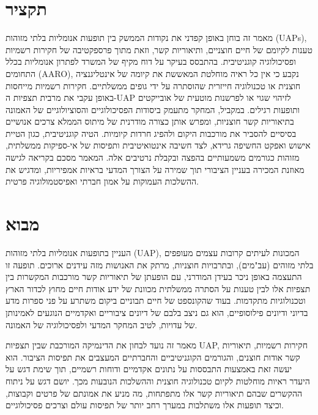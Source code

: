 \documentclass[12pt,a4paper]{article}
\begin{document}
\section*{תקציר}
מאמר זה בוחן באופן קפדני את נקודות הממשק בין תופעות אנומליות בלתי מזוהות (UAPs), טענות לקיומם של חיים חוצניים, ותיאוריות קשר, וזאת מתוך פרספקטיבה של חקירות רשמיות ופסיכולוגיה קוגניטיבית. בהתבסס בעיקר על דוח מקיף של המשרד לפתרון אנומליות בכלל התחומים (AARO), נקבע כי אין כל ראיה מוחלטת המאששת את קיומה של אינטליגנציה חוצנית או טכנולוגיה חייזרית שהוסתרה על ידי גופים ממשלתיים. חקירות רשמיות מייחסות באופן עקבי את מרבית תצפיות ה-UAP לזיהוי שגוי או לפרשנות מוטעית של אובייקטים ותופעות רגילים. במקביל, המחקר מתעמק ביסודות הפסיכולוגיים והסוציולוגיים של האמונה בתיאוריות קשר חוצניות, ומפרש אותן כצורה מודרנית של מיתוס הממלא צרכים אנושיים בסיסיים להסביר את מורכבות היקום ולהפיג חרדות קיומיות. הטיה קוגניטיבית, כגון הטיית אישוש ואפקט החשיפה גרידא, לצד חשיבה אינטואיטיבית ותפיסות של אי-ספיקות ממשלתית, מזוהות כגורמים משמעותיים בהפצה ובקבלת נרטיבים אלה. המאמר מסכם בקריאה לגישה מאוזנת המכירה בעניין הציבורי תוך שמירה על הצורך המדעי בראיות אמפיריות, ומדגיש את ההשלכות העמוקות על אמון חברתי ואפיסטמולוגיה פרטית.

\tableofcontents

\section{מבוא}
העניין בתופעות אנומליות בלתי מזוהות (UAP), המכונות לעיתים קרובות עצמים מעופפים בלתי מזוהים (עב"מים), ובתרבויות חוצניות, מרתק את האנושות מזה עידנים ארוכים. תופעה זו התעצמה באופן ניכר בעידן המודרני, עם הופעתן של תיאוריות קשר מורכבות המקשרות בין תצפיות אלו לבין טענות על הסתרה ממשלתית מכוונת של ידע אודות חיים מחוץ לכדור הארץ וטכנולוגיות מתקדמות. בעוד שהקונספט של חיים תבוניים ביקום משתרע על פני ספרות מדע בדיוני ודיונים פילוסופיים, הוא גם ניצב בלבם של דיונים ציבוריים ואקדמיים הנוגעים לאמינותן של עדויות, לטיב המחקר המדעי ולפסיכולוגיה של האמונה.

מאמר זה נועד לבחון את הדינמיקה המורכבת שבין תצפיות UAP, חקירות רשמיות, תיאוריות קשר אודות חוצנים, והגורמים הקוגניטיביים והחברתיים המעצבים את תפיסות הציבור. הוא יעשה זאת באמצעות התבססות על נתונים אקדמיים ודוחות רשמיים, תוך שימת דגש על היעדר ראיות מוחלטות לקיום טכנולוגיה חוצנית וההשלכות הנובעות מכך. יושם דגש על ניתוח ההקשרים שבהם תיאוריות קשר אלו מתפתחות, מה מניע את אמונתם של פרטים וקבוצות, וכיצד תופעות אלו משתלבות במערך רחב יותר של תפיסות עולם וצרכים פסיכולוגיים.
\end{document}
